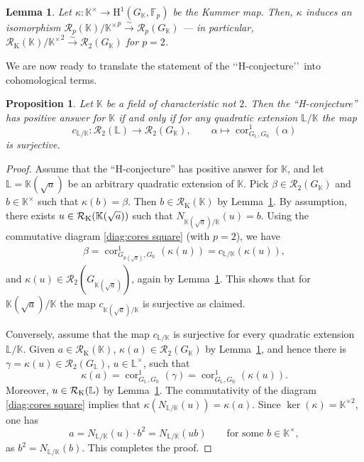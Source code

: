 \documentclass{amsart}
\newtheorem{prop}[thm]{Proposition}
\newtheorem{lem}[thm]{Lemma}
\theoremstyle{definition}
\theoremstyle{remark}
\DeclareMathOperator{\cores}{cor}
\newcommand{\KK}{\mathbb{K}}
\newcommand{\LL}{\mathbb{L}}
\newcommand{\FF}{\mathbb{F}}
\newcommand{\calR}{\mathcal{R}}
\newcommand{\rmH}{\mathrm H}%
\newcommand{\K}{\KK}
\begin{document}
\begin{lem}
\label{lemma:RelationBetweenRadicals}
{ Let $\kappa:\KK^\times \to \rmH^1(G_\KK,\FF_p)$ be the Kummer map. Then, $\kappa$ induces an isomorphism $\calR_{p}(\KK)/{\KK^{\times}}^p\overset{\sim}{\to}\calR_p(G_{\KK})$ --- in particular, $\calR_{\mathrm{K}}(\KK)/{\KK^{\times}}^2\overset{\sim}{\to}\calR_2(G_{\KK})$ for $p=2$.}
\end{lem}
We are now ready to translate the statement of the \lq\lq H-conjecture\rq\rq\, into cohomological terms.
\begin{prop}\label{prop:equivalence}
   Let $\KK$ be a field of characteristic not $2$.
Then the ``H-conjecture'' has positive answer for $\KK$ if and only if for any quadratic extension $\LL/\KK$ the map 
    \begin{equation*}
        c_{\LL/\KK}:\calR_2(\LL)\longrightarrow \calR_2(G_{\KK}),\qquad \alpha\longmapsto \cores_{G_{\LL},G_\KK}^1(\alpha)
    \end{equation*}
    is surjective.
\end{prop}

\begin{proof}
    Assume that the ``H-conjecture'' has positive answer  for $\KK$, and let $\LL=\KK(\sqrt{a})$ be an arbitrary quadratic extension of $\KK$. 
    Pick $\beta\in \calR_2(G_\KK)$ and $b\in \KK^\times$ such that $\kappa(b)=\beta$. Then $b\in {\calR_{\mathrm{K}}}(\KK)$ by Lemma~\ref{lemma:RelationBetweenRadicals}.
    By assumption, there exists $u\in \calR_{\rm K}(\K(\sqrt{a}))$ such that $N_{\K(\sqrt{a})/\KK}(u)=b$. Using the commutative diagram \eqref{diag:cores square} (with $p=2$), we have 
    \begin{align*}
        \beta=\cores^1_{G_{\K(\sqrt{a})},G_\KK}(\kappa(u))=c_{\LL/\KK}(\kappa(u)),
    \end{align*}
    and $\kappa(u)\in\calR_2(G_{\K(\sqrt{a})})$, again by Lemma~\ref{lemma:RelationBetweenRadicals}.
    This shows that for $\K(\sqrt{a})/\KK$ the map $c_{\K(\sqrt{a})/\K}$ is surjective as claimed. 

Conversely, assume that the map $c_{\LL/\KK}$ is surjective for every quadratic extension $\LL/\KK$. Given $a\in {\calR_{\mathrm{K}}}(\KK)$, $\kappa(a)\in\calR_2(G_{\KK})$ by Lemma~\ref{lemma:RelationBetweenRadicals}, and hence there is $\gamma=\kappa(u)\in\calR_2(G_{\LL})$, $u\in\LL^\times$, such that $$\kappa(a)=\cores_{G_\LL,G_\KK}^1(\gamma)=\cores_{G_\LL,G_\KK}^1(\kappa(u)).$$
Moreover, $u\in\calR_{\rm K}(\LL)$ by Lemma~\ref{lemma:RelationBetweenRadicals}.
The commutativity of the diagram \eqref{diag:cores square} implies that $\kappa(N_{\LL/\KK}(u))=\kappa(a)$. 
Since $\ker(\kappa)=\KK^{\times 2}$, one has $$a=N_{\LL/\KK}(u)\cdot b^2=N_{\LL/\KK}(ub)\qquad\text{for some }b\in \KK^\times,$$ as $b^2=N_{\LL/\KK}(b)$. This completes the proof.
\end{proof}
\end{document}
